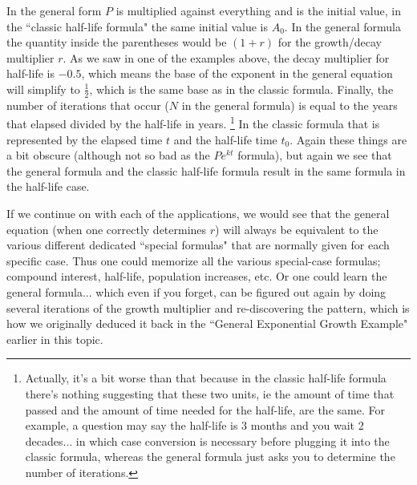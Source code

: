 \documentclass{ximera}
\begin{document}
        In the general form $P$ is multiplied against everything and is the initial value, in the ``classic half-life formula" the same initial value is $A_0$. In the general formula the quantity inside the parentheses would be $(1 + r)$ for the growth/decay multiplier $r$. As we saw in one of the examples above, the decay multiplier for half-life is $-0.5$, which means the base of the exponent in the general equation will simplify to $\frac{1}{2}$, which is the same base as in the classic formula. Finally, the number of iterations that occur ($N$ in the general formula) is equal to the years that elapsed divided by the half-life in years.%
        \footnote{
            Actually, it's a bit worse than that because in the classic half-life formula there's nothing suggesting that these two units, ie the amount of time that passed and the amount of time needed for the half-life, are the same. For example, a question may say the half-life is 3 months and you wait 2 decades... in which case conversion is necessary before plugging it into the classic formula, whereas the general formula just asks you to determine the number of iterations.
            }
        In the classic formula that is represented by the elapsed time $t$ and the half-life time $t_0$. Again these things are a bit obscure (although not so bad as the $Pe^{kt}$ formula), but again we see that the general formula and the classic half-life formula result in the same formula in the half-life case.
        
        If we continue on with each of the applications, we would see that the general equation (when one correctly determines $r$) will always be equivalent to the various different dedicated ``special formulas" that are normally given for each specific case. Thus one could memorize all the various special-case formulas; compound interest, half-life, population increases, etc. Or one could learn the general formula... which even if you forget, can be figured out again by doing several iterations of the growth multiplier and re-discovering the pattern, which is how we originally deduced it back in the ``General Exponential Growth Example" earlier in this topic.

%
\end{document}

